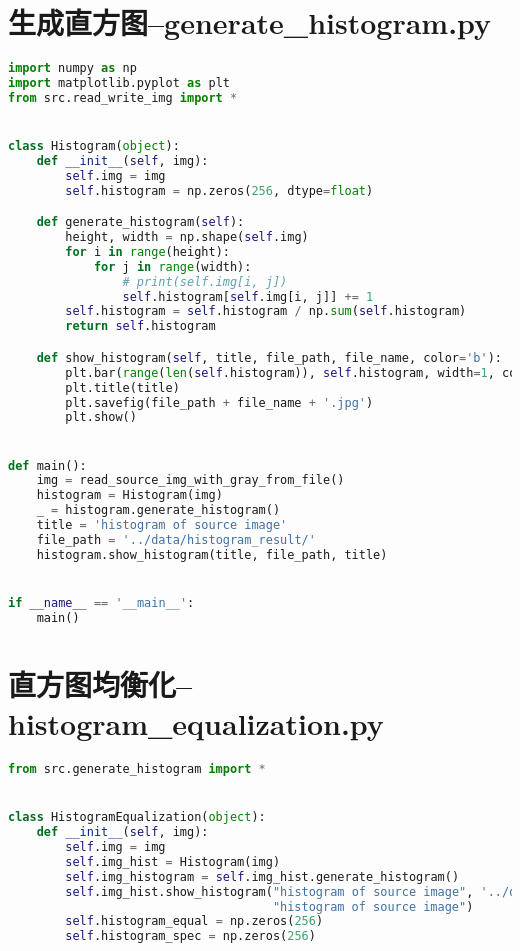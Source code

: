 \documentclass{hitreport}
\begin{document}
\newpage
\begin{appendices}

\section{生成直方图--generate\_histogram.py}\label{app:gen}
\begin{lstlisting}[language=python]
import numpy as np
import matplotlib.pyplot as plt
from src.read_write_img import *


class Histogram(object):
    def __init__(self, img):
        self.img = img
        self.histogram = np.zeros(256, dtype=float)

    def generate_histogram(self):
        height, width = np.shape(self.img)
        for i in range(height):
            for j in range(width):
                # print(self.img[i, j])
                self.histogram[self.img[i, j]] += 1
        self.histogram = self.histogram / np.sum(self.histogram)
        return self.histogram

    def show_histogram(self, title, file_path, file_name, color='b'):
        plt.bar(range(len(self.histogram)), self.histogram, width=1, color=color)
        plt.title(title)
        plt.savefig(file_path + file_name + '.jpg')
        plt.show()


def main():
    img = read_source_img_with_gray_from_file()
    histogram = Histogram(img)
    _ = histogram.generate_histogram()
    title = 'histogram of source image'
    file_path = '../data/histogram_result/'
    histogram.show_histogram(title, file_path, title)


if __name__ == '__main__':
    main()

\end{lstlisting}

\section{直方图均衡化--histogram\_equalization.py}\label{app:hisequ}
\begin{lstlisting}[language=python]
from src.generate_histogram import *


class HistogramEqualization(object):
    def __init__(self, img):
        self.img = img
        self.img_hist = Histogram(img)
        self.img_histogram = self.img_hist.generate_histogram()
        self.img_hist.show_histogram("histogram of source image", '../data/histogram_result/',
                                     "histogram of source image")
        self.histogram_equal = np.zeros(256)
        self.histogram_spec = np.zeros(256)


\end{lstlisting}
\end{appendices}
\end{document}
